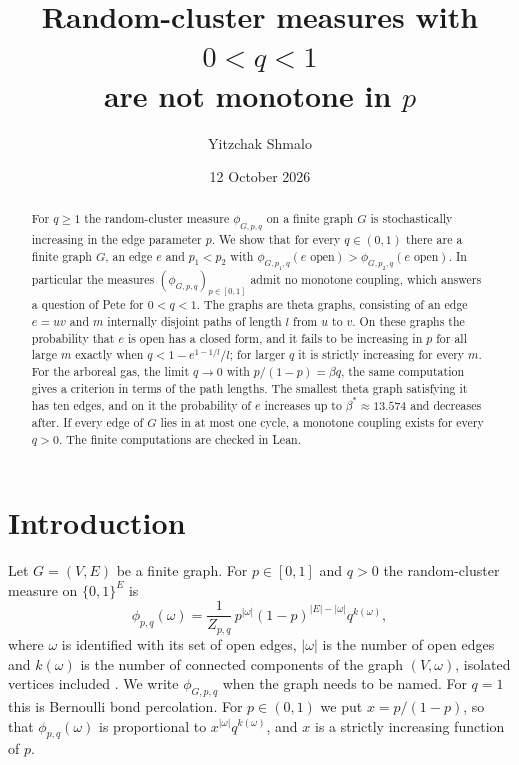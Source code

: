 \documentclass[11pt]{amsart}
\title[Random-cluster measures with $0<q<1$ are not monotone]{Random-cluster measures with $0<q<1$\\ are not monotone in $p$}
\author{Yitzchak Shmalo}
\date{12 October 2026}
\theoremstyle{remark}
\numberwithin{equation}{section}
\begin{document}
\begin{abstract}
For $q\ge1$ the random-cluster measure $\phi_{G,p,q}$ on a finite graph $G$ is stochastically increasing in the edge parameter $p$. We show that for every $q\in(0,1)$ there are a finite graph $G$, an edge $e$ and $p_1<p_2$ with $\phi_{G,p_1,q}(e\text{ open})>\phi_{G,p_2,q}(e\text{ open})$. In particular the measures $(\phi_{G,p,q})_{p\in[0,1]}$ admit no monotone coupling, which answers a question of Pete for $0<q<1$. The graphs are theta graphs, consisting of an edge $e=uv$ and $m$ internally disjoint paths of length $l$ from $u$ to $v$. On these graphs the probability that $e$ is open has a closed form, and it fails to be increasing in $p$ for all large $m$ exactly when $q<1-e^{1-1/l}/l$; for larger $q$ it is strictly increasing for every $m$. For the arboreal gas, the limit $q\to0$ with $p/(1-p)=\beta q$, the same computation gives a criterion in terms of the path lengths. The smallest theta graph satisfying it has ten edges, and on it the probability of $e$ increases up to $\beta^*\approx13.574$ and decreases after. If every edge of $G$ lies in at most one cycle, a monotone coupling exists for every $q>0$. The finite computations are checked in Lean.
\end{abstract}
\maketitle

\section{Introduction}\label{sec:intro}

Let $G=(V,E)$ be a finite graph. For $p\in[0,1]$ and $q>0$ the random-cluster measure on $\{0,1\}^E$ is
\begin{equation}\label{eq:fk}
 \phi_{p,q}(\omega)=\frac1{Z_{p,q}}\,p^{|\omega|}(1-p)^{|E|-|\omega|}q^{k(\omega)},
\end{equation}
where $\omega$ is identified with its set of open edges, $|\omega|$ is the number of open edges and $k(\omega)$ is the number of connected components of the graph $(V,\omega)$, isolated vertices included \cite{FK72,Gri06}. We write $\phi_{G,p,q}$ when the graph needs to be named. For $q=1$ this is Bernoulli bond percolation. For $p\in(0,1)$ we put $x=p/(1-p)$, so that $\phi_{p,q}(\omega)$ is proportional to $x^{|\omega|}q^{k(\omega)}$, and $x$ is a strictly increasing function of $p$.
\end{document}
